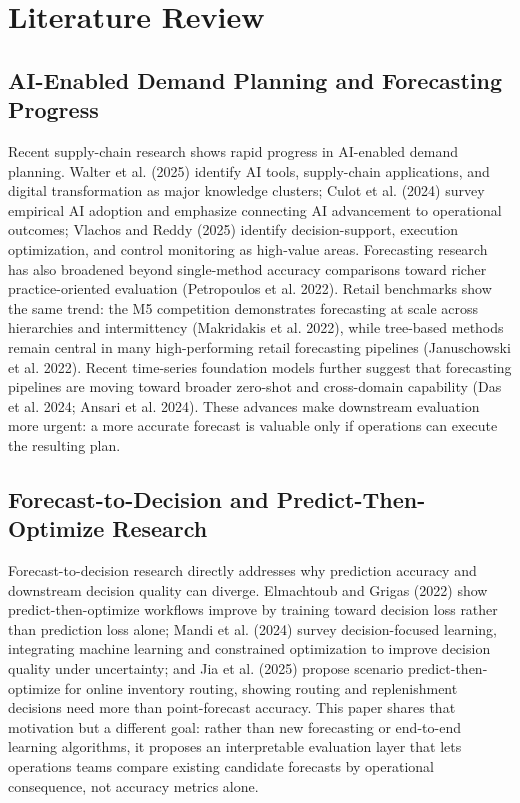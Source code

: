 \section{Literature Review}

\subsection{AI-Enabled Demand Planning and Forecasting Progress}

Recent supply-chain research shows rapid progress in AI-enabled demand planning. Walter et al. (2025) identify AI tools, supply-chain applications, and digital transformation as major knowledge clusters; Culot et al. (2024) survey empirical AI adoption and emphasize connecting AI advancement to operational outcomes; Vlachos and Reddy (2025) identify decision-support, execution optimization, and control monitoring as high-value areas. Forecasting research has also broadened beyond single-method accuracy comparisons toward richer practice-oriented evaluation (Petropoulos et al. 2022). Retail benchmarks show the same trend: the M5 competition demonstrates forecasting at scale across hierarchies and intermittency (Makridakis et al. 2022), while tree-based methods remain central in many high-performing retail forecasting pipelines (Januschowski et al. 2022). Recent time-series foundation models further suggest that forecasting pipelines are moving toward broader zero-shot and cross-domain capability (Das et al. 2024; Ansari et al. 2024). These advances make downstream evaluation more urgent: a more accurate forecast is valuable only if operations can execute the resulting plan.

\subsection{Forecast-to-Decision and Predict-Then-Optimize Research}

Forecast-to-decision research directly addresses why prediction accuracy and downstream decision quality can diverge. Elmachtoub and Grigas (2022) show predict-then-optimize workflows improve by training toward decision loss rather than prediction loss alone; Mandi et al. (2024) survey decision-focused learning, integrating machine learning and constrained optimization to improve decision quality under uncertainty; and Jia et al. (2025) propose scenario predict-then-optimize for online inventory routing, showing routing and replenishment decisions need more than point-forecast accuracy. This paper shares that motivation but a different goal: rather than new forecasting or end-to-end learning algorithms, it proposes an interpretable evaluation layer that lets operations teams compare existing candidate forecasts by operational consequence, not accuracy metrics alone.

